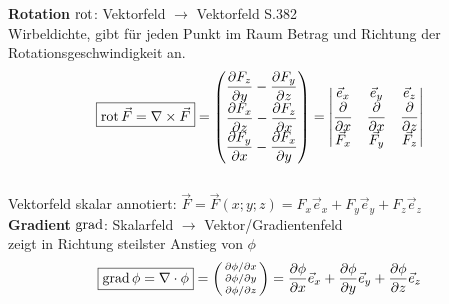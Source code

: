 \textbf{Rotation} $\operatorname{rot}$: Vektorfeld $\rightarrow$ Vektorfeld \qquad S.382\\ 
\small{Wirbeldichte, gibt für jeden Punkt im Raum Betrag und Richtung der Rotationsgeschwindigkeit an.}
\begin{align*}
\boxed{\operatorname{rot} \vec{F} = \nabla \times \vec{F} } = 
\begin{pmatrix}
    \dfrac{\partial F_z}{\partial y} - \dfrac{\partial F_y}{\partial z} \\
    \dfrac{\partial F_x}{\partial z} - \dfrac{\partial F_z}{\partial x} \\
    \dfrac{\partial F_y}{\partial x} - \dfrac{\partial F_x}{\partial y}
\end{pmatrix} =
\begin{vmatrix}
    \vec{e}_x & \vec{e}_y & \vec{e}_z \\
    \dfrac{\partial}{\partial x} & \dfrac{\partial }{\partial x} & \dfrac{\partial }{\partial z} \\
    \vec{F}_x & \vec{F}_y & \vec{F}_z
\end{vmatrix}
\end{align*}\\
Vektorfeld skalar annotiert: $\vec{F} = \vec{F}(x;y;z) = F_x\vec{e}_x+F_y\vec{e}_y+F_z\vec{e}_z$\\

\textbf{Gradient} $\operatorname{grad}$: Skalarfeld $\rightarrow$ Vektor/Gradientenfeld\\ 
\small{zeigt in Richtung steilster Anstieg von $\phi$}
\begin{align*}                                                                                          
    \boxed{\operatorname{grad} \phi = \nabla \cdot \phi }=  
    \begin{psmallmatrix}
        \partial \phi / \partial x \\
        \partial \phi / \partial y \\
        \partial \phi / \partial z
    \end{psmallmatrix}
    = \dfrac{\partial \phi}{\partial x} \vec{e}_x + \dfrac{\partial \phi}{\partial y} \vec{e}_y + 
    \dfrac{\partial \phi}{\partial z} \vec{e}_z  
\end{align*}


